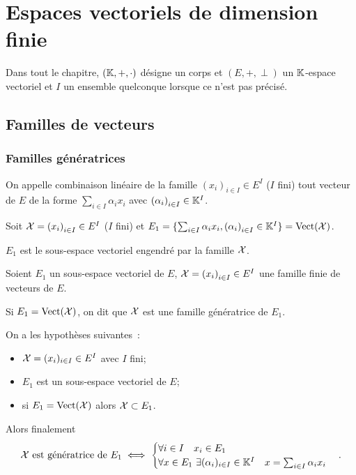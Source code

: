 \chapter{Espaces vectoriels de dimension finie}\label{chap:dimensionfinie}
\minitoc%
\minilof%
\minilot%

Dans tout le chapitre, \((\mathbb{K},+,\cdot)\) désigne un corps et \((E,+,\perp)\) un
\(\mathbb{K}\)-espace vectoriel et \(I\) un ensemble quelconque lorsque ce n'est pas
précisé.
\section{Familles de vecteurs}

\subsection{Familles génératrices}

\begin{defdef}
  On appelle combinaison linéaire de la famille \({(x_i)}_{i \in I} \in E^I\)
  (\(I\) fini) tout vecteur de \(E\) de la forme \(\sum_{i \in I}\alpha_i x_i\)
  avec \({(\alpha_i)}_{i\in I} \in \mathbb{K}^I\).

  Soit \(\mathcal{X}={(x_i)}_{i \in I} \in E^I\) (\(I\) fini) et \(E_1 = \{\sum_{i \in
  I}\alpha_i x_i, {(\alpha_i)}_{i\in I} \in \mathbb{K}^I\}= \operatorname{Vect}(\mathcal{X})\).

  \(E_1\) est le sous-espace vectoriel engendré par la famille \(\mathcal{X}\).
\end{defdef}

\begin{defdef}
  Soient \(E_1\) un sous-espace vectoriel de \(E\), \(\mathcal{X} = {(x_i)}_{i \in I}\in
  E^I\) une famille finie de vecteurs de \(E\).

  Si \(E_1=\operatorname{Vect}(\mathcal{X})\), on dit que \(\mathcal{X}\) est une famille génératrice de
  \(E_1\).
\end{defdef}
On a les hypothèses suivantes~:
\begin{itemize}
  \item \(\mathcal{X}=(x_i)_{i \in I} \in E^I\) avec \(I\) fini;
  \item \(E_1\) est un sous-espace vectoriel de \(E\);
  \item si \(E_1 = \operatorname{Vect}(\mathcal{X})\) alors \(\mathcal{X} \subset E_1\).
\end{itemize}
Alors finalement
\begin{equation}
  \mathcal{X} \text{~est génératrice de } E_1 \iff \begin{cases} \forall i \in I \quad
  x_i \in E_1 \\ \forall x \in E_1 \ \exists (\alpha_i)_{i \in I} \in \mathbb{K}^I \quad
  x=\sum_{i \in I} \alpha_i x_i \end{cases}.
\end{equation}

